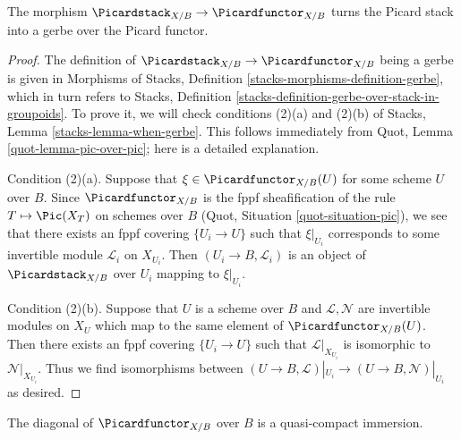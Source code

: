 \begin{lemma}
\label{lemma-pic-gerbe-over-pic-functor}
The morphism $\Picardstack_{X/B} \to \Picardfunctor_{X/B}$
turns the Picard stack into a gerbe over the Picard functor.
\end{lemma}

\begin{proof}
The definition of $\Picardstack_{X/B} \to \Picardfunctor_{X/B}$ being
a gerbe is given in Morphisms of Stacks, Definition
\ref{stacks-morphisms-definition-gerbe}, which in turn refers to
Stacks, Definition \ref{stacks-definition-gerbe-over-stack-in-groupoids}.
To prove it, we will check conditions (2)(a) and (2)(b) of
Stacks, Lemma \ref{stacks-lemma-when-gerbe}. This follows immediately from
Quot, Lemma \ref{quot-lemma-pic-over-pic}; here is a detailed explanation.

\medskip\noindent
Condition (2)(a).
Suppose that $\xi \in \Picardfunctor_{X/B}(U)$ for some scheme $U$ over $B$.
Since $\Picardfunctor_{X/B}$ is the fppf sheafification of the rule
$T \mapsto \Pic(X_T)$ on schemes over $B$
(Quot, Situation \ref{quot-situation-pic}), we see that there exists an
fppf covering $\{U_i \to U\}$ such that $\xi|_{U_i}$ corresponds
to some invertible module $\mathcal{L}_i$ on $X_{U_i}$.
Then $(U_i \to B, \mathcal{L}_i)$ is an object of
$\Picardstack_{X/B}$ over $U_i$ mapping to $\xi|_{U_i}$.

\medskip\noindent
Condition (2)(b). Suppose that $U$ is a scheme over $B$ and
$\mathcal{L}, \mathcal{N}$ are invertible modules on $X_U$
which map to the same element of $\Picardfunctor_{X/B}(U)$.
Then there exists an fppf covering $\{U_i \to U\}$
such that $\mathcal{L}|_{X_{U_i}}$ is isomorphic to $\mathcal{N}|_{X_{U_i}}$.
Thus we find isomorphisms between
$(U \to B, \mathcal{L})|_{U_i} \to (U \to B, \mathcal{N})|_{U_i}$
as desired.
\end{proof}

\begin{lemma}
\label{lemma-pic-functor-diagonal-qc-immersion}
The diagonal of $\Picardfunctor_{X/B}$ over $B$ is a quasi-compact immersion.
\end{lemma}

